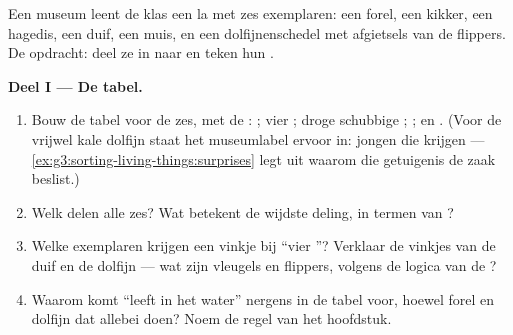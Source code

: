 \begin{problem}\label{pb:g6:classification-kinship:1}
Een museum leent de klas een la met zes exemplaren: een forel, een
kikker, een hagedis, een duif, een muis, en een dolfijnenschedel met
afgietsels van de flippers. De opdracht: deel ze in naar  en
teken hun .

\medskip\noindent\textbf{Deel I --- De tabel.}
\begin{enumerate}
  \item Bouw de tabel voor de zes, met de : ; vier
        ; droge schubbige ; ;  en . (Voor de
        vrijwel kale dolfijn staat het museumlabel ervoor in: jongen die
         krijgen ---
        \cref{ex:g3:sorting-living-things:surprises} legt uit waarom die
        getuigenis de zaak beslist.)
  \item Welk  delen alle zes? Wat betekent de wijdste deling, in
        termen van ?
  \item Welke exemplaren krijgen een vinkje bij ``vier ''?
        Verklaar de vinkjes van de duif en de dolfijn --- wat zijn
        vleugels en flippers, volgens de logica van de ?
  \item Waarom komt ``leeft in het water'' nergens in de tabel voor,
        hoewel forel en dolfijn dat allebei doen? Noem de regel van het
        hoofdstuk.
\end{enumerate}


\end{problem}
